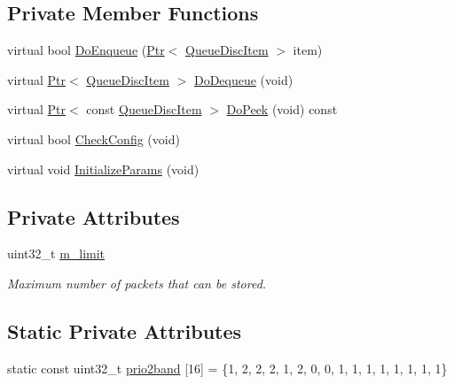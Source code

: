 \subsection*{Private Member Functions}
\begin{DoxyCompactItemize}
\item 
virtual bool \hyperlink{classns3_1_1PfifoFastQueueDisc_aac7fa518f6f59bf89a7a5fa5b9579d8b}{Do\+Enqueue} (\hyperlink{classns3_1_1Ptr}{Ptr}$<$ \hyperlink{classns3_1_1QueueDiscItem}{Queue\+Disc\+Item} $>$ item)
\item 
virtual \hyperlink{classns3_1_1Ptr}{Ptr}$<$ \hyperlink{classns3_1_1QueueDiscItem}{Queue\+Disc\+Item} $>$ \hyperlink{classns3_1_1PfifoFastQueueDisc_aa5fe80fa033b5df94f626d99e99d52f3}{Do\+Dequeue} (void)
\item 
virtual \hyperlink{classns3_1_1Ptr}{Ptr}$<$ const \hyperlink{classns3_1_1QueueDiscItem}{Queue\+Disc\+Item} $>$ \hyperlink{classns3_1_1PfifoFastQueueDisc_ac94bb03da6c61c6b4d2755ca77704470}{Do\+Peek} (void) const 
\item 
virtual bool \hyperlink{classns3_1_1PfifoFastQueueDisc_a9fa5e68b79b7431cd734f4e8845bdced}{Check\+Config} (void)
\item 
virtual void \hyperlink{classns3_1_1PfifoFastQueueDisc_abea83fd533e5e527f04a58cd079de204}{Initialize\+Params} (void)
\end{DoxyCompactItemize}
\subsection*{Private Attributes}
\begin{DoxyCompactItemize}
\item 
uint32\+\_\+t \hyperlink{classns3_1_1PfifoFastQueueDisc_ac0c01461b2419ffafef7485e526c1990}{m\+\_\+limit}
\begin{DoxyCompactList}\small\item\em Maximum number of packets that can be stored. \end{DoxyCompactList}\end{DoxyCompactItemize}
\subsection*{Static Private Attributes}
\begin{DoxyCompactItemize}
\item 
static const uint32\+\_\+t \hyperlink{classns3_1_1PfifoFastQueueDisc_ae5565927d8c9b16c534480c24c5f38ab}{prio2band} \mbox{[}16\mbox{]} = \{1, 2, 2, 2, 1, 2, 0, 0, 1, 1, 1, 1, 1, 1, 1, 1\}
\end{DoxyCompactItemize}
